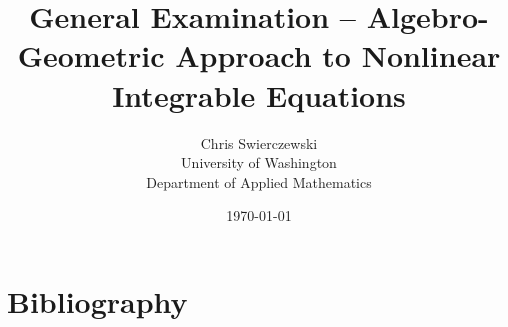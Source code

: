 \documentclass[10pt,twoside]{article}
\title{General Examination -- Algebro-Geometric
  Approach to Nonlinear Integrable Equations}
\author{
Chris Swierczewski\\
University of Washington\\
Department of Applied Mathematics}
\date{\today}
\theoremstyle{plain}
\theoremstyle{definition}
\numberwithin{equation}{section}
\numberwithin{figure}{section}
\begin{document}

\maketitle





\section{Bibliography}






\end{document}
